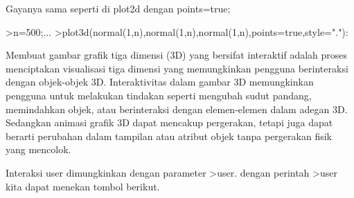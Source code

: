 \documentclass[a4paper,10pt]{article}
\begin{document}
\begin{eulernotebook}
\begin{eulercomment}
Gayanya sama seperti di plot2d dengan points=true;
\end{eulercomment}
\begin{eulerprompt}
>n=500;...
>plot3d(normal(1,n),normal(1,n),normal(1,n),points=true,style="."):
\end{eulerprompt}
\begin{eulercomment}
Membuat gambar grafik tiga dimensi (3D) yang bersifat interaktif
adalah proses menciptakan visualisasi tiga dimensi yang memungkinkan
pengguna berinteraksi dengan objek-objek 3D. Interaktivitas dalam
gambar 3D memungkinkan pengguna untuk melakukan tindakan seperti
mengubah sudut pandang, memindahkan objek, atau berinteraksi dengan
elemen-elemen dalam adegan 3D. Sedangkan animasi grafik 3D dapat
mencakup pergerakan, tetapi juga dapat berarti perubahan dalam
tampilan atau atribut objek tanpa pergerakan fisik yang mencolok.

Interaksi user dimungkinkan dengan parameter \textgreater{}user. dengan perintah
\textgreater{}user kita dapat menekan tombol berikut.


\end{eulercomment}
\end{eulernotebook}
\end{document}
